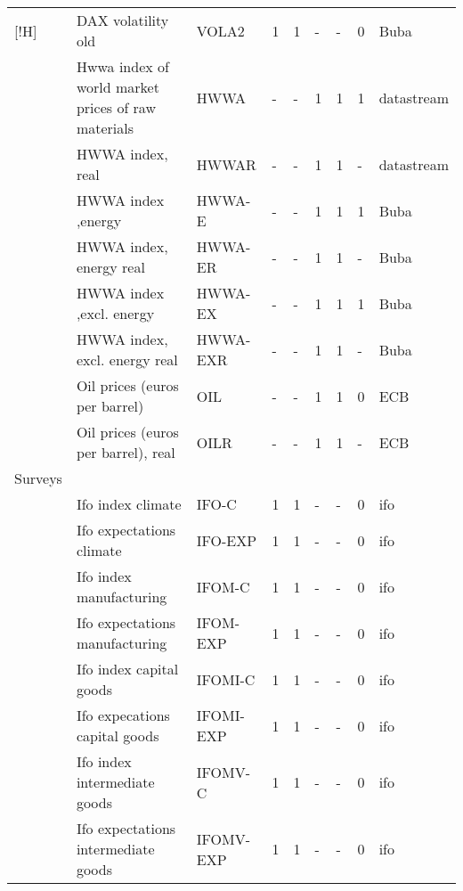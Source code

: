 \documentclass[10pt]{article}
\begin{document}
\begin{footnotesize}
\begin{longtable}{p{1.1in}|p{2.5in}|p{1in}|p{.1in}|p{.1in}|p{.1in}|p{.15in}|p{.1in}|p{.5in}}[!H]
 & {\tiny{}DAX volatility old} & {\tiny{}VOLA2} & {\tiny{}1} & {\tiny{}1} & {\tiny{}-} & {\tiny{}-} & {\tiny{}0} & {\tiny{}Buba}\tabularnewline
 & {\tiny{}Hwwa index of world market prices of raw materials} & {\tiny{}HWWA} & {\tiny{}-} & {\tiny{}-} & {\tiny{}1} & {\tiny{}1} & {\tiny{}1} & {\tiny{}datastream}\tabularnewline
 & {\tiny{}HWWA index, real} & {\tiny{}HWWAR} & {\tiny{}-} & {\tiny{}-} & {\tiny{}1} & {\tiny{}1} & {\tiny{}-} & {\tiny{}datastream}\tabularnewline
 & {\tiny{}HWWA index ,energy} & {\tiny{}HWWA-E} & {\tiny{}-} & {\tiny{}-} & {\tiny{}1} & {\tiny{}1} & {\tiny{}1} & {\tiny{}Buba}\tabularnewline
 & {\tiny{}HWWA index, energy real} & {\tiny{}HWWA-ER} & {\tiny{}-} & {\tiny{}-} & {\tiny{}1} & {\tiny{}1} & {\tiny{}-} & {\tiny{}Buba}\tabularnewline
 & {\tiny{}HWWA index ,excl. energy} & {\tiny{}HWWA-EX} & {\tiny{}-} & {\tiny{}-} & {\tiny{}1} & {\tiny{}1} & {\tiny{}1} & {\tiny{}Buba}\tabularnewline
 & {\tiny{}HWWA index, excl. energy real} & {\tiny{}HWWA-EXR} & {\tiny{}-} & {\tiny{}-} & {\tiny{}1} & {\tiny{}1} & {\tiny{}-} & {\tiny{}Buba}\tabularnewline
 & {\tiny{}Oil prices (euros per barrel)} & {\tiny{}OIL} & {\tiny{}-} & {\tiny{}-} & {\tiny{}1} & {\tiny{}1} & {\tiny{}0} & {\tiny{}ECB}\tabularnewline
 & {\tiny{}Oil prices (euros per barrel), real} & {\tiny{}OILR} & {\tiny{}-} & {\tiny{}-} & {\tiny{}1} & {\tiny{}1} & {\tiny{}-} & {\tiny{}ECB}\tabularnewline
{\tiny{}Surveys} &  &  &  &  &  &  &  & \tabularnewline
 & {\tiny{}Ifo index climate} & {\tiny{}IFO-C} & {\tiny{}1} & {\tiny{}1} & {\tiny{}-} & {\tiny{}-} & {\tiny{}0} & {\tiny{}ifo}\tabularnewline
 & {\tiny{}Ifo expectations climate} & {\tiny{}IFO-EXP} & {\tiny{}1} & {\tiny{}1} & {\tiny{}-} & {\tiny{}-} & {\tiny{}0} & {\tiny{}ifo}\tabularnewline
 & {\tiny{}Ifo index manufacturing} & {\tiny{}IFOM-C} & {\tiny{}1} & {\tiny{}1} & {\tiny{}-} & {\tiny{}-} & {\tiny{}0} & {\tiny{}ifo}\tabularnewline
 & {\tiny{}Ifo expectations manufacturing} & {\tiny{}IFOM-EXP} & {\tiny{}1} & {\tiny{}1} & {\tiny{}-} & {\tiny{}-} & {\tiny{}0} & {\tiny{}ifo}\tabularnewline
 & {\tiny{}Ifo index capital goods} & {\tiny{}IFOMI-C} & {\tiny{}1} & {\tiny{}1} & {\tiny{}-} & {\tiny{}-} & {\tiny{}0} & {\tiny{}ifo}\tabularnewline
 & {\tiny{}Ifo expecations capital goods} & {\tiny{}IFOMI-EXP} & {\tiny{}1} & {\tiny{}1} & {\tiny{}-} & {\tiny{}-} & {\tiny{}0} & {\tiny{}ifo}\tabularnewline
 & {\tiny{}Ifo index intermediate goods} & {\tiny{}IFOMV-C} & {\tiny{}1} & {\tiny{}1} & {\tiny{}-} & {\tiny{}-} & {\tiny{}0} & {\tiny{}ifo}\tabularnewline
 & {\tiny{}Ifo expectations intermediate goods} & {\tiny{}IFOMV-EXP} & {\tiny{}1} & {\tiny{}1} & {\tiny{}-} & {\tiny{}-} & {\tiny{}0} & {\tiny{}ifo}\tabularnewline

\end{longtable}
\end{footnotesize}
\end{document}
